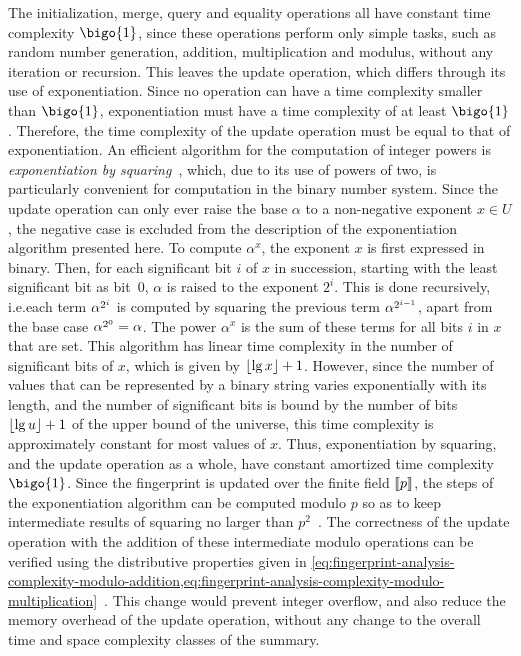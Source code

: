 The initialization, merge, query and equality operations all have constant time complexity \( \bigo{1} \), since these operations perform only simple tasks, such as random number generation, addition, multiplication and modulus, without any iteration or recursion.
This leaves the update operation, which differs through its use of exponentiation.
Since no operation can have a time complexity smaller than \( \bigo{1} \), exponentiation must have a time complexity of at least \( \bigo{1} \).
Therefore, the time complexity of the update operation must be equal to that of exponentiation.
An efficient algorithm for the computation of integer powers is \emph{exponentiation by squaring}~\citep{gueron12}, which, due to its use of powers of two, is particularly convenient for computation in the binary number system.
Since the update operation can only ever raise the base \( \alpha \) to a non-negative exponent \( x \in U \), the negative case is excluded from the description of the exponentiation algorithm presented here.
To compute \( \alpha^{x} \), the exponent \( x \) is first expressed in binary.
Then, for each significant bit \( i \) of \( x \) in succession, starting with the least significant bit as bit~\( 0 \), \( \alpha \) is raised to the exponent \( 2^{i} \).
This is done recursively, i.e.\@ each term \( \cramped{\alpha^{2^{i}}} \) is computed by squaring the previous term \( \cramped{\alpha^{2^{i - 1}}} \), apart from the base case \( \cramped{\alpha^{2^{0}}} = \alpha \).
The power \( \alpha^{x} \) is the sum of these terms for all bits \( i \) in \( x \) that are set.
This algorithm has linear time complexity in the number of significant bits of \( x \), which is given by \( \lfloor\lg x\rfloor + 1 \).
However, since the number of values that can be represented by a binary string varies exponentially with its length, and the number of significant bits is bound by the number of bits \( \lfloor\lg u\rfloor + 1 \) of the upper bound of the universe, this time complexity is approximately constant for most values of \( x \).
Thus, exponentiation by squaring, and the update operation as a whole, have constant amortized time complexity \( \bigo{1} \).
Since the fingerprint is updated over the finite field \( \llbracket p\rrbracket \), the steps of the exponentiation algorithm can be computed modulo \( p \) so as to keep intermediate results of squaring no larger than \( p^{2} \)~\citep{cormode20}.
The correctness of the update operation with the addition of these intermediate modulo operations can be verified using the distributive properties given in \cref{eq:fingerprint-analysis-complexity-modulo-addition,eq:fingerprint-analysis-complexity-modulo-multiplication}~\citep{graham94}.
This change would prevent integer overflow, and also reduce the memory overhead of the update operation, without any change to the overall time and space complexity classes of the summary.

